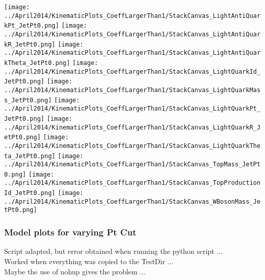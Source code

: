 \begin{center}
\texttt{[image: ../April2014/KinematicPlots\_CoeffLargerThan1/StackCanvas\_LightAntiQuarkPt\_JetPt0.png]}
\texttt{[image: ../April2014/KinematicPlots\_CoeffLargerThan1/StackCanvas\_LightAntiQuarkR\_JetPt0.png]}
\texttt{[image: ../April2014/KinematicPlots\_CoeffLargerThan1/StackCanvas\_LightAntiQuarkTheta\_JetPt0.png]}
\texttt{[image: ../April2014/KinematicPlots\_CoeffLargerThan1/StackCanvas\_LightQuarkId\_JetPt0.png]}
\texttt{[image: ../April2014/KinematicPlots\_CoeffLargerThan1/StackCanvas\_LightQuarkMass\_JetPt0.png]}
\texttt{[image: ../April2014/KinematicPlots\_CoeffLargerThan1/StackCanvas\_LightQuarkPt\_JetPt0.png]}
\texttt{[image: ../April2014/KinematicPlots\_CoeffLargerThan1/StackCanvas\_LightQuarkR\_JetPt0.png]}
\texttt{[image: ../April2014/KinematicPlots\_CoeffLargerThan1/StackCanvas\_LightQuarkTheta\_JetPt0.png]}
\texttt{[image: ../April2014/KinematicPlots\_CoeffLargerThan1/StackCanvas\_TopMass\_JetPt0.png]}
\texttt{[image: ../April2014/KinematicPlots\_CoeffLargerThan1/StackCanvas\_TopProductionId\_JetPt0.png]}
\texttt{[image: ../April2014/KinematicPlots\_CoeffLargerThan1/StackCanvas\_WBosonMass\_JetPt0.png]}
\end{center}

\subsubsection{Model plots for varying Pt Cut}
Script adapted, but error obtained when running the python script ...\\
Worked when everything was copied to the TestDir ...\\
Maybe the use of nohup gives the problem ...
